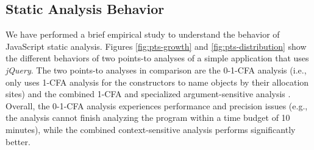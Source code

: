

\subsection{Static Analysis Behavior}

We have performed a brief empirical study to understand the behavior of JavaScript static analysis. Figures \ref{fig:pts-growth} and \ref{fig:pts-distribution} show the different behaviors of two points-to analyses of a simple application that uses {\it jQuery}. The two points-to analyses in comparison are the 0-1-CFA analysis (i.e., only uses 1-CFA analysis for the constructors to name objects by their allocation sites) and the combined 1-CFA and specialized argument-sensitive analysis \cite{Sridharan:2012:CTP:2367163.2367191}. Overall, the 0-1-CFA analysis experiences performance and precision issues (e.g., the analysis cannot finish analyzing the program within a time budget of 10 minutes), while the combined context-sensitive analysis performs significantly better.

